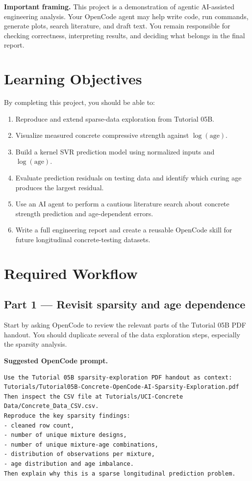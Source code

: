 \documentclass[12pt]{article}
\begin{document}
\begin{alert-box}
\textbf{Important framing.}  This project is a demonstration of agentic AI-assisted engineering analysis.  Your OpenCode agent may help write code, run commands, generate plots, search literature, and draft text.  You remain responsible for checking correctness, interpreting results, and deciding what belongs in the final report.
\end{alert-box}

\section*{Learning Objectives}

By completing this project, you should be able to:

\begin{enumerate}[label=\arabic*.]
  \item Reproduce and extend sparse-data exploration from Tutorial 05B.
  \item Visualize measured concrete compressive strength against $\log(\text{age})$.
  \item Build a kernel SVR prediction model using normalized inputs and $\log(\text{age})$.
  \item Evaluate prediction residuals on testing data and identify which curing age produces the largest residual.
  \item Use an AI agent to perform a cautious literature search about concrete strength prediction and age-dependent errors.
  \item Write a full engineering report and create a reusable OpenCode skill for future longitudinal concrete-testing datasets.
\end{enumerate}

\section{Required Workflow}

\subsection{Part 1 --- Revisit sparsity and age dependence}

Start by asking OpenCode to review the relevant parts of the Tutorial 05B PDF handout.  You should duplicate several of the data exploration steps, especially the sparsity analysis.

\begin{ex-box}
\textbf{Suggested OpenCode prompt.}
\begin{lstlisting}[style=term]
Use the Tutorial 05B sparsity-exploration PDF handout as context:
Tutorials/Tutorial05B-Concrete-OpenCode-AI-Sparsity-Exploration.pdf
Then inspect the CSV file at Tutorials/UCI-Concrete Data/Concrete_Data_CSV.csv.
Reproduce the key sparsity findings:
- cleaned row count,
- number of unique mixture designs,
- number of unique mixture-age combinations,
- distribution of observations per mixture,
- age distribution and age imbalance.
Then explain why this is a sparse longitudinal prediction problem.
\end{lstlisting}
\end{ex-box}
\end{document}

